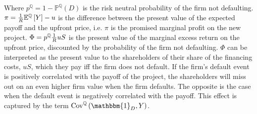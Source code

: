 \documentclass[../main.tex]{subfiles}
\begin{document}
        Where $p^{\mathbb{Q}} = 1 - \mathbb{P}^{\mathbb{Q}}\left(D\right)$ is the risk neutral probability of the firm not defaulting. 
        $\pi = \frac{1}{R} \mathbb{E}^{\mathbb{Q}}\left[Y\right] - u$ 
        is the difference between the present value of the expected payoff and the upfront price, 
        i.e. $\pi$ is the promised marginal profit on the new project. 
        $\Phi = p^{\mathbb{Q}} \frac{1}{R} u S$
        is the present value of the marginal excess return on the upfront price, 
        discounted by the probability of the firm not defaulting.
        $\Phi$ can be interpreted as the present value to the shareholders of their share of the financing costs, $uS$,
        which they pay iff the firm does not default. 
        If the firm's default event is positively correlated with the payoff of the project,
        the shareholders will miss out on an even higher firm value when the firm defaults.
        The opposite is the case when the default event is negatively correlated with the payoff.
        This effect is captured by the term 
        $\text{Cov}^{\mathbb{Q}}\left(\mathbbm{1}_{D}, Y\right)$.
\end{document}
